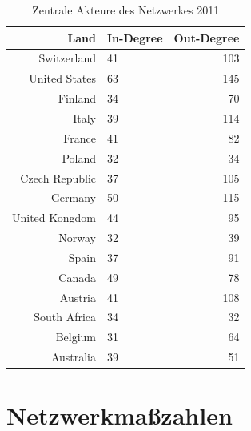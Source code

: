 \documentclass[a4paper,ngerman,oneside,titlepage,bibliography=totoc,11pt]{scrreprt}
\begin{document}
	\begin{table}[h]
\centering
\footnotesize
\begin{tabular}{rlr}
  \hline
 Land 						& In-Degree & Out-Degree\\ 
  \hline
 Switzerland 			& 41				& 103\\ 
 United States 		& 63				& 145\\ 
 Finland 					& 34				& 70\\ 
 Italy 						& 39 				& 114\\ 
 France						& 41				& 82\\ 
 Poland						& 32				& 34\\
 Czech Republic		& 37				& 105\\
 Germany					& 50				& 115\\
 United Kongdom		& 44				& 95\\
 Norway						& 32				& 39\\
 Spain  					& 37				& 91\\
 Canada						& 49				& 78\\
 Austria					& 41				& 108\\
 South Africa			& 34				& 32\\
 Belgium					& 31				& 64\\
 Australia				& 39				& 51\\
   \hline
\end{tabular}
\caption{Zentrale Akteure des Netzwerkes 2011} 
\label{top_2011}
	\end{table}



\section{Netzwerkmaßzahlen}
\end{document}
